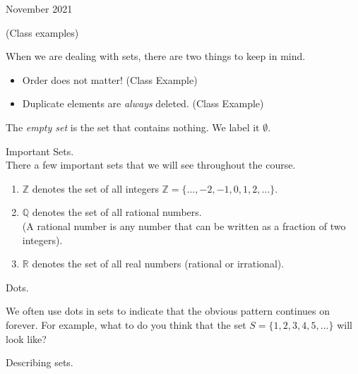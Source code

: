 \documentclass[12pt,oneside]{book} %
\begin{document}
\begin{lec}{November 2021}
\begin{notn}
		(Class examples)
			\end{notn}

		\begin{rem}
			When we are dealing with sets, there are two things to keep in mind.
				\begin{itemize}
					\item Order does not matter! (Class Example)
					\item Duplicate elements are \emph{always} deleted. (Class Example)
					\end{itemize}
			\end{rem}

			\begin{mdframed}
				\begin{defn}
			The \emph{empty set} is the set that contains nothing. We label it $\emptyset$.
				\end{defn}
			\end{mdframed}

			\vspace*{0.2cm}

			\begin{mdframed}
				\begin{defn} Important Sets.\\
					There a few important sets that we will see throughout the course.
					\begin{enumerate}
					\item $\mathbb Z$ denotes the set of all integers $\mathbb Z = \{\dots,-2,-1,0,1,2,\dots \}$.
					\item $\mathbb Q$ denotes the set of all rational numbers.\\ (A rational number is any number that can be written as a fraction
						of two integers).
					\item $\mathbb R$ denotes the set of all real numbers (rational or irrational).
					\end{enumerate}
								
					\end{defn}
			\end{mdframed}
			
			\newpage
	\begin{notn}
			Dots.

			We often use dots in sets to indicate that the obvious pattern continues on forever. For example, what to do you think that
			the set $S = \{1,2,3,4,5,\dots\}$ will look like?
			\end{notn}

		\begin{notn} Describing sets.


\end{notn}
\end{lec}
\end{document}
